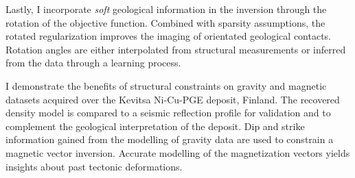 Lastly, I incorporate \emph{soft} geological information in the inversion through the rotation of the objective function. Combined with sparsity assumptions, the rotated regularization improves the imaging of orientated geological contacts. Rotation angles are either interpolated from structural measurements or inferred from the data through a learning process.

I demonstrate the benefits of structural constraints on gravity and magnetic datasets acquired over the Kevitsa Ni-Cu-PGE deposit, Finland. The recovered density model is compared to a seismic reflection profile for validation and to complement the geological interpretation of the deposit. Dip and strike information gained from the modelling of gravity data are used to constrain a magnetic vector inversion. Accurate modelling of the magnetization vectors yields insights about past tectonic deformations.






